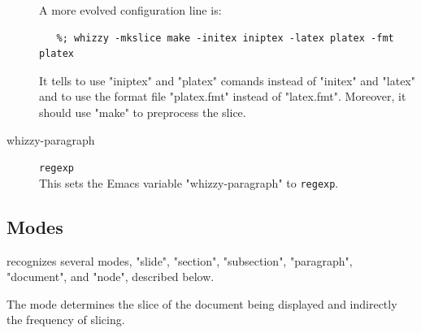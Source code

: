 \documentclass[12pt]{article}
\begin{document}
\begin{description}
A more evolved configuration line is:
\begin{verbatim}
   %; whizzy -mkslice make -initex iniptex -latex platex -fmt platex
\end{verbatim}
It tells {\whizzy} to use \lst"iniptex" and \lst"platex" comands instead
of \lst"initex" and \lst"latex" and to use the format file \lst"platex.fmt" 
instead of \lst"latex.fmt". Moreover, it should use \lst"make" to preprocess
the slice.

\item[whizzy-paragraph] \texttt{regexp}\\
This sets the Emacs variable \lst"whizzy-paragraph" to \texttt{regexp}.
\end{description} 


\subsection {Modes} 
\label {modes}

{\whizzy} recognizes several modes,
\lst"slide",
\lst"section",
\lst"subsection",
\lst"paragraph",
\lst"document", and
\lst"node", described below.

The mode determines the slice of the document being displayed and indirectly
the frequency of slicing.
\end{document}
